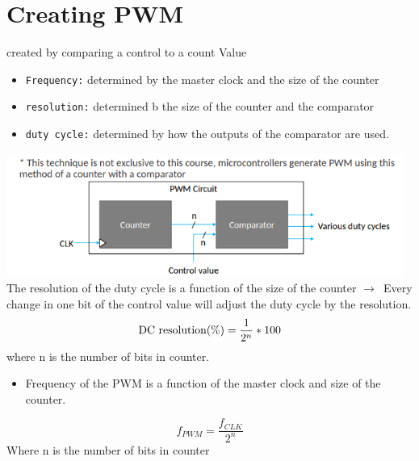 \documentclass[a4paper,12pt]{article}
\newcommand{\ra}{$\rightarrow$}
\begin{document}
    \section{Creating PWM}
    created by comparing a control to a count Value
    \begin{itemize}
        \item \texttt{Frequency:} determined by the master clock and the size of the counter
        \item \texttt{resolution:} determined b the size of the counter and the comparator
        \item \texttt{duty cycle:} determined by how the outputs of the comparator are used.
    \end{itemize}
    \includegraphics[width=13cm]{PMWmicro.png}
    \\ The resolution of the duty cycle is a function of the size of the counter \ra~Every change in one bit of the control value will adjust the duty cycle by the resolution. \[\textnormal{DC resolution(\%)}=\frac{1}{2^n}*100\] where n is the number of bits in counter.
    \begin{itemize}
        \item Frequency of the PWM is a function of the master clock and size of the counter.
    \end{itemize}
    \[f_{PWM}=\frac{f_{CLK}}{2^n}\] Where n is the number of bits in counter
\end{document}
